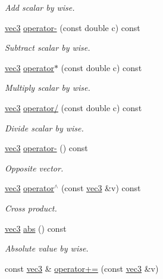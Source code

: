 \begin{DoxyCompactItemize}
\begin{DoxyCompactList}\small\item\em Add scalar by wise. \end{DoxyCompactList}\item 
\mbox{\hyperlink{structvec3}{vec3}} \mbox{\hyperlink{structvec3_a00615545da4a7f61be923dc8c4e0557e}{operator-\/}} (const double c) const
\begin{DoxyCompactList}\small\item\em Subtract scalar by wise. \end{DoxyCompactList}\item 
\mbox{\hyperlink{structvec3}{vec3}} \mbox{\hyperlink{structvec3_a0f446233cd7b3fe50bc3d773c85177d5}{operator$\ast$}} (const double c) const
\begin{DoxyCompactList}\small\item\em Multiply scalar by wise. \end{DoxyCompactList}\item 
\mbox{\hyperlink{structvec3}{vec3}} \mbox{\hyperlink{structvec3_aefb92d2dd7d6410991dffc593e9ab874}{operator/}} (const double c) const
\begin{DoxyCompactList}\small\item\em Divide scalar by wise. \end{DoxyCompactList}\item 
\mbox{\hyperlink{structvec3}{vec3}} \mbox{\hyperlink{structvec3_a9ee0d5d83bd70141b9424928d0ea9c98}{operator-\/}} () const
\begin{DoxyCompactList}\small\item\em Opposite vector. \end{DoxyCompactList}\item 
\mbox{\hyperlink{structvec3}{vec3}} \mbox{\hyperlink{structvec3_a6469fdfd7c378f5f30e299bc2e1e776a}{operator$^\wedge$}} (const \mbox{\hyperlink{structvec3}{vec3}} \&v) const
\begin{DoxyCompactList}\small\item\em Cross product. \end{DoxyCompactList}\item 
\mbox{\hyperlink{structvec3}{vec3}} \mbox{\hyperlink{structvec3_abf0d30ac0a81beeacd36ddc86ec6ee83}{abs}} () const
\begin{DoxyCompactList}\small\item\em Absolute value by wise. \end{DoxyCompactList}\item 
const \mbox{\hyperlink{structvec3}{vec3}} \& \mbox{\hyperlink{structvec3_a5d12f7aba42eea6253a4ada5ce73b7d8}{operator+=}} (const \mbox{\hyperlink{structvec3}{vec3}} \&v)

\end{DoxyCompactItemize}
